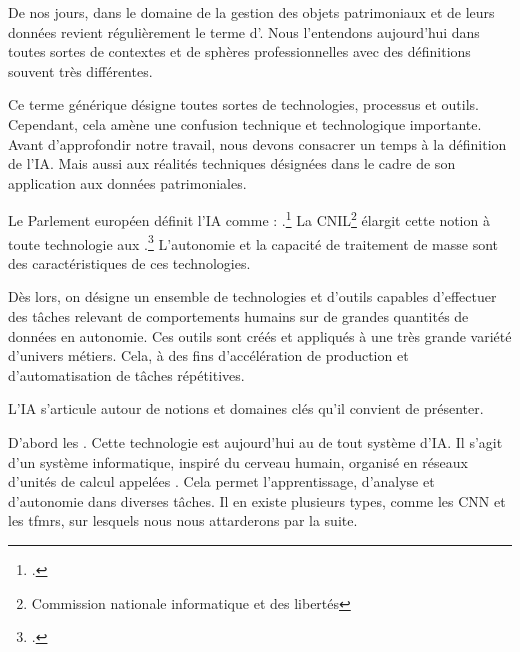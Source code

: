 
\label{IA?}

De nos jours, dans le domaine de la gestion des objets patrimoniaux et de leurs données revient régulièrement le terme d'. Nous l'entendons aujourd'hui dans toutes sortes de contextes et de sphères professionnelles avec des définitions souvent très différentes. 

Ce terme générique désigne toutes sortes de technologies, processus et outils. Cependant, cela amène une confusion technique et technologique importante. Avant d'approfondir notre travail, nous devons consacrer un temps à la définition de l'\gls{IA}. Mais aussi aux réalités techniques désignées dans le cadre de son application aux données patrimoniales.\newline

Le Parlement européen définit l'\gls{IA} comme : .\footcite{IntelligenceArtificielleDefinition2020} La CNIL\footnote{Commission nationale informatique et des libertés} élargit cette notion à toute technologie aux .\footcite{IntelligenceArtificielleQuoi} L'autonomie et la capacité de traitement de masse sont des caractéristiques de ces technologies. 

Dès lors, on désigne un ensemble de technologies et d'outils capables d'effectuer des tâches relevant de comportements humains sur de grandes quantités de données en autonomie. Ces outils sont créés et appliqués à une très grande variété d'univers métiers. Cela, à des fins d'accélération de production et d'automatisation de tâches répétitives.

L'\gls{IA} s'articule autour de notions et domaines clés qu'il convient de présenter. 

D'abord les . Cette technologie est aujourd'hui au \coeur de tout système d'\gls{IA}. Il s'agit d'un système informatique, inspiré du cerveau humain, organisé en réseaux d'unités de calcul appelées . Cela permet l'apprentissage, d'analyse et d'autonomie dans diverses tâches. Il en existe plusieurs types, comme les \gls{CNN} et les \gls{tfmrs}, sur lesquels nous nous attarderons par la suite. 

